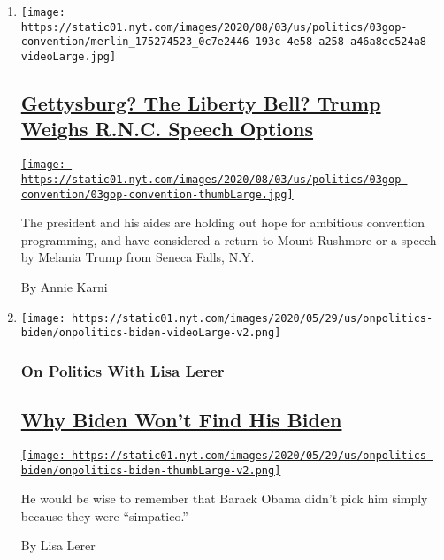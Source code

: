 \begin{enumerate}
\def\labelenumi{\arabic{enumi}.}
\item
  \texttt{[image: https://static01.nyt.com/images/2020/08/03/us/politics/03gop-convention/merlin\_175274523\_0c7e2446-193c-4e58-a258-a46a8ec524a8-videoLarge.jpg]}

  \hypertarget{gettysburg-the-liberty-bell-trump-weighs-rnc-speech-options}{%
  \subsection{\texorpdfstring{\href{/2020/08/03/us/politics/trump-rnc-speech.html}{Gettysburg?
  The Liberty Bell? Trump Weighs R.N.C. Speech
  Options}}{Gettysburg? The Liberty Bell? Trump Weighs R.N.C. Speech Options}}\label{gettysburg-the-liberty-bell-trump-weighs-rnc-speech-options}}

  \href{/2020/08/03/us/politics/trump-rnc-speech.html}{\texttt{[image: https://static01.nyt.com/images/2020/08/03/us/politics/03gop-convention/03gop-convention-thumbLarge.jpg]}}

  The president and his aides are holding out hope for ambitious
  convention programming, and have considered a return to Mount Rushmore
  or a speech by Melania Trump from Seneca Falls, N.Y.

  By Annie Karni
\item
  \texttt{[image: https://static01.nyt.com/images/2020/05/29/us/onpolitics-biden/onpolitics-biden-videoLarge-v2.png]}

  \hypertarget{on-politics-with-lisa-lerer}{%
  \subsubsection{On Politics With Lisa
  Lerer}\label{on-politics-with-lisa-lerer}}

  \hypertarget{why-biden-wont-find-his-biden}{%
  \subsection{\texorpdfstring{\href{/2020/08/03/us/politics/joe-biden-vp.html}{Why
  Biden Won't Find His
  Biden}}{Why Biden Won't Find His Biden}}\label{why-biden-wont-find-his-biden}}

  \href{/2020/08/03/us/politics/joe-biden-vp.html}{\texttt{[image: https://static01.nyt.com/images/2020/05/29/us/onpolitics-biden/onpolitics-biden-thumbLarge-v2.png]}}

  He would be wise to remember that Barack Obama didn't pick him simply
  because they were ``simpatico.''

  By Lisa Lerer
\end{enumerate}

